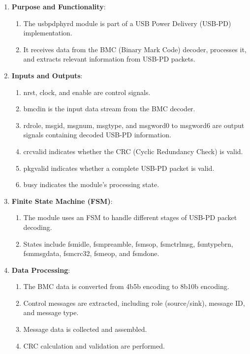 \begin{enumerate}
    \item \textbf{Purpose and Functionality}:
    \begin{enumerate}
        \item The usb\textunderscore pd\textunderscore phy\textunderscore rd module is part of a USB Power Delivery (USB-PD) implementation.
        \item It receives data from the BMC (Binary Mark Code) decoder, processes it, and extracts relevant information from USB-PD packets. 
    \end{enumerate}
    
    \item \textbf{Inputs and Outputs}:
    \begin{enumerate}
        \item nrst, clock, and enable are control signals.
        \item bmc\textunderscore din is the input data stream from the BMC decoder.
        \item rd\textunderscore role, msg\textunderscore id, msg\textunderscore num, msg\textunderscore type, and msg\textunderscore word0 to msg\textunderscore word6 are output signals  containing decoded USB-PD information.
        \item crc\textunderscore valid indicates whether the CRC (Cyclic Redundancy Check) is valid.
        \item pkg\textunderscore valid indicates whether a complete USB-PD packet is valid.
          \item busy indicates the module’s processing state.
    \end{enumerate}
    
    \item \textbf{Finite State Machine (FSM)}:
    \begin{enumerate}
        \item The module uses an FSM to handle different stages of USB-PD packet decoding.
    \item States include fsm\textunderscore idle, fsm\textunderscore preamble, fsm\textunderscore sop, fsm\textunderscore ctrl\textunderscore msg, fsm\textunderscore type\textunderscore brn, fsm\textunderscore msg\textunderscore data, fsm\textunderscore crc32, fsm\textunderscore eop, and fsm\textunderscore done. 
    \end{enumerate}
    
    \item \textbf{Data Processing}:
    \begin{enumerate}
        \item The BMC data is converted from 4b5b encoding to 8b10b encoding.
    \item Control messages are extracted, including role (source/sink), message ID, and message type.
    \item Message data is collected and assembled.
    \item CRC calculation and validation are performed.
    \end{enumerate}
    

\end{enumerate}
